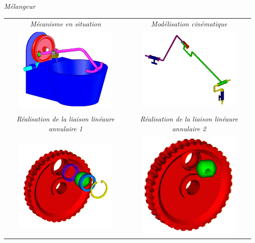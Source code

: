 \documentclass[10pt,oneside]{article}
\begin{document}
\begin{exemple}
\textit{Mélangeur}
\begin{center}
\begin{tabular}{cc}
\textit{Mécanisme en situation} & \textit{Modélisation cinématique} \\
\includegraphics[width=5cm]{png/melangeur_1} & \includegraphics[width=5cm]{png/melangeur_2} \\
& \\
\textit{Réalisation de la liaison linéaure annulaire 1} & \textit{Réalisation de la liaison linéaure annulaire 2} \\ 
\includegraphics[width=5cm]{png/melangeur_3} & \includegraphics[width=5cm]{png/melangeur_4} \\


\end{tabular}
\end{center}
\end{exemple}
\end{document}
